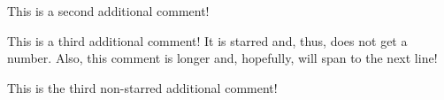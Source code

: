 \begin{AIDcomment}
This is a second additional comment!
\end{AIDcomment}

\begin{AIDcomment*}
This is a third additional comment! It is starred and, thus, does not get a number. Also, this comment is longer and, hopefully, will span to the next line!
\end{AIDcomment*}

\begin{AIDcomment}
This is the third non-starred additional comment!
\end{AIDcomment}




